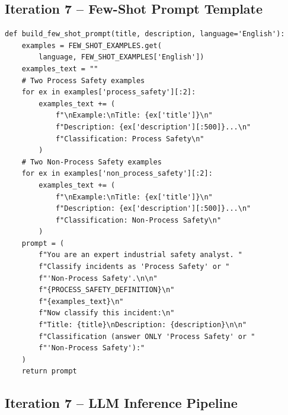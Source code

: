 \documentclass[11pt, titlepage, bibliography=totoc]{scrreprt}
\begin{document}
\subsection*{Iteration 7 -- Few-Shot Prompt Template}

\begin{lstlisting}[label=lst:few-shot-prompt,
  caption={Few-shot classification prompt template for Iteration~7, prepending the PS definition and two examples per class before the target incident.}]
def build_few_shot_prompt(title, description, language='English'):
    examples = FEW_SHOT_EXAMPLES.get(
        language, FEW_SHOT_EXAMPLES['English'])
    examples_text = ""
    # Two Process Safety examples
    for ex in examples['process_safety'][:2]:
        examples_text += (
            f"\nExample:\nTitle: {ex['title']}\n"
            f"Description: {ex['description'][:500]}...\n"
            f"Classification: Process Safety\n"
        )
    # Two Non-Process Safety examples
    for ex in examples['non_process_safety'][:2]:
        examples_text += (
            f"\nExample:\nTitle: {ex['title']}\n"
            f"Description: {ex['description'][:500]}...\n"
            f"Classification: Non-Process Safety\n"
        )
    prompt = (
        f"You are an expert industrial safety analyst. "
        f"Classify incidents as 'Process Safety' or "
        f"'Non-Process Safety'.\n\n"
        f"{PROCESS_SAFETY_DEFINITION}\n"
        f"{examples_text}\n"
        f"Now classify this incident:\n"
        f"Title: {title}\nDescription: {description}\n\n"
        f"Classification (answer ONLY 'Process Safety' or "
        f"'Non-Process Safety'):"
    )
    return prompt
\end{lstlisting}

\subsection*{Iteration 7 -- LLM Inference Pipeline}
\end{document}
